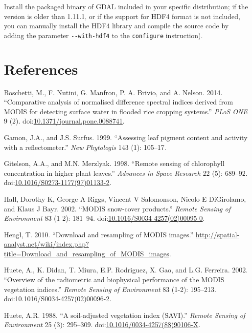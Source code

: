 \documentclass[]{article}
\begin{document}
Install the packaged binary of GDAL included in your specific
distribution; if the version is older than 1.11.1, or if the support for
HDF4 format is not included, you can manually install the HDF4 library
and compile the source code by adding the parameter
\texttt{-\/-with-hdf4} to the \texttt{configure} instruction).

\section*{References}\label{references}

\hypertarget{refs}{}
\hypertarget{ref-Boschetti2014}{}
Boschetti, M., F. Nutini, G. Manfron, P. A. Brivio, and A. Nelson. 2014.
``Comparative analysis of normalised difference spectral indices derived
from MODIS for detecting surface water in flooded rice cropping
systems.'' \emph{PLoS ONE} 9 (2).
doi:\href{https://doi.org/10.1371/journal.pone.0088741}{10.1371/journal.pone.0088741}.

\hypertarget{ref-Gamon1999}{}
Gamon, J.A., and J.S. Surfus. 1999. ``Assessing leaf pigment content and
activity with a reflectometer.'' \emph{New Phytologis} 143 (1): 105--17.

\hypertarget{ref-Gitelson1998}{}
Gitelson, A.A., and M.N. Merzlyak. 1998. ``Remote sensing of chlorophyll
concentration in higher plant leaves.'' \emph{Advances in Space
Research} 22 (5): 689--92.
doi:\href{https://doi.org/10.1016/S0273-1177(97)01133-2}{10.1016/S0273-1177(97)01133-2}.

\hypertarget{ref-Hall2002}{}
Hall, Dorothy K, George A Riggs, Vincent V Salomonson, Nicolo E
DiGirolamo, and Klaus J Bayr. 2002. ``MODIS snow-cover products.''
\emph{Remote Sensing of Environment} 83 (1-2): 181--94.
doi:\href{https://doi.org/10.1016/S0034-4257(02)00095-0}{10.1016/S0034-4257(02)00095-0}.

\hypertarget{ref-Hengl2010}{}
Hengl, T. 2010. ``Download and resampling of MODIS images.''
\url{http://spatial-analyst.net/wiki/index.php?title=Download_and_resampling_of_MODIS_images}.

\hypertarget{ref-Huete2002}{}
Huete, A., K. Didan, T. Miura, E.P. Rodriguez, X. Gao, and L.G.
Ferreira. 2002. ``Overview of the radiometric and biophysical
performance of the MODIS vegetation indices.'' \emph{Remote Sensing of
Environment} 83 (1-2): 195--213.
doi:\href{https://doi.org/10.1016/S0034-4257(02)00096-2}{10.1016/S0034-4257(02)00096-2}.

\hypertarget{ref-Huete1988}{}
Huete, A.R. 1988. ``A soil-adjusted vegetation index (SAVI).''
\emph{Remote Sensing of Environment} 25 (3): 295--309.
doi:\href{https://doi.org/10.1016/0034-4257(88)90106-X}{10.1016/0034-4257(88)90106-X}.
\end{document}
